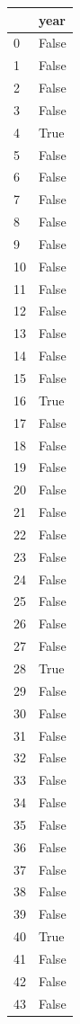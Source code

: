 \documentclass[
  letterpaper,
  DIV=11,
  numbers=noendperiod]{scrreprt}
\begin{document}
\begin{tabular}{ll}
\toprule
{} &   year \\
\midrule
0    &  False \\
1    &  False \\
2    &  False \\
3    &  False \\
4    &   True \\
5    &  False \\
6    &  False \\
7    &  False \\
8    &  False \\
9    &  False \\
10   &  False \\
11   &  False \\
12   &  False \\
13   &  False \\
14   &  False \\
15   &  False \\
16   &   True \\
17   &  False \\
18   &  False \\
19   &  False \\
20   &  False \\
21   &  False \\
22   &  False \\
23   &  False \\
24   &  False \\
25   &  False \\
26   &  False \\
27   &  False \\
28   &   True \\
29   &  False \\
30   &  False \\
31   &  False \\
32   &  False \\
33   &  False \\
34   &  False \\
35   &  False \\
36   &  False \\
37   &  False \\
38   &  False \\
39   &  False \\
40   &   True \\
41   &  False \\
42   &  False \\
43   &  False \\

\end{tabular}
\end{document}
